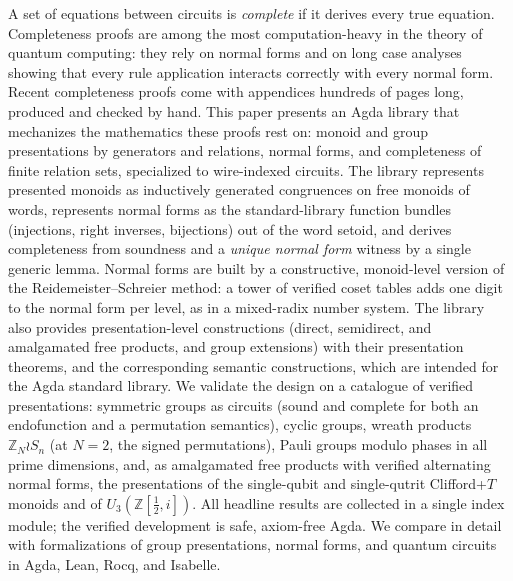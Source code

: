 A set of equations between circuits is \emph{complete} if it derives every
true equation.  Completeness proofs are among the most computation-heavy in
the theory of quantum computing: they rely on normal forms and on long
case analyses showing that every rule application interacts correctly with
every normal form.  Recent completeness proofs come with appendices hundreds
of pages long, produced and checked by hand.  This paper presents an Agda
library that mechanizes the mathematics these proofs rest on: monoid and group
presentations by generators and relations, normal forms, and completeness of
finite relation sets, specialized to wire-indexed circuits.  The library
represents presented monoids as inductively generated congruences on free
monoids of words, represents normal forms as the standard-library function
bundles (injections, right inverses, bijections) out of the word setoid, and
derives completeness from soundness and a \emph{unique normal form} witness by
a single generic lemma.  Normal forms are built by a constructive,
monoid-level version of the Reidemeister--Schreier method: a tower of
verified coset tables adds one digit to the normal form per level, as in a
mixed-radix number system.  The library also provides presentation-level
constructions (direct, semidirect, and amalgamated free products, and group
extensions) with their presentation theorems, and the corresponding semantic
constructions, which are intended for the Agda standard library.  We validate
the design on a catalogue of verified presentations:
symmetric groups as circuits (sound and complete for both an endofunction and
a permutation semantics), cyclic groups, wreath products $\mathbb{Z}_N \wr S_n$
(at $N = 2$, the signed permutations), Pauli groups modulo phases in all prime
dimensions, and, as amalgamated free products with verified alternating normal
forms, the presentations of the single-qubit and single-qutrit Clifford+$T$
monoids and of $U_3(\mathbb{Z}[\tfrac12,i])$.  All headline results are
collected in a single index module; the verified development is safe, axiom-free
Agda.  We compare in detail
with formalizations of group presentations, normal forms, and quantum circuits
in Agda, Lean, Rocq, and Isabelle.
